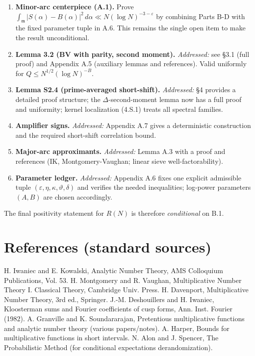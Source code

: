 \documentclass[11pt]{article}
\theoremstyle{definition}
\theoremstyle{remark}
\begin{document}
\begin{enumerate}[label=\textbf{B.\arabic*}]
	\item \textbf{Minor-arc centerpiece (A.1).} Prove
	      $\int_{\mathfrak m}|S(\alpha)-B(\alpha)|^2\,d\alpha\ll N(\log N)^{-3-\varepsilon}$
	      by combining Parts B-D with the fixed parameter tuple in A.6. This remains the single open item to make the result unconditional.

	\item \textbf{Lemma 3.2 (BV with parity, second moment).} \emph{Addressed:} see §3.1 (full proof) and Appendix A.5 (auxiliary lemmas and references). Valid uniformly for $Q\le N^{1/2}(\log N)^{-B}$.

	\item \textbf{Lemma S2.4 (prime-averaged short-shift).} \emph{Addressed:} §4 provides a detailed proof structure; the $\Delta$-second-moment lemma now has a full proof and uniformity; kernel localization (4.S.1) treats all spectral families.

	\item \textbf{Amplifier signs.} \emph{Addressed:} Appendix A.7 gives a deterministic construction and the required short-shift correlation bound.

	\item \textbf{Major-arc approximants.} \emph{Addressed:} Lemma A.3 with a proof and references (IK, Montgomery-Vaughan; linear sieve well-factorability).

	\item \textbf{Parameter ledger.} \emph{Addressed:} Appendix A.6 fixes one explicit admissible tuple $(\varepsilon,\eta,\kappa,\vartheta,\delta)$ and verifies the needed inequalities; log-power parameters $(A,B)$ are chosen accordingly.
\end{enumerate}

The final positivity statement for $R(N)$ is therefore \emph{conditional} on B.1.

\section*{References (standard sources)}
H. Iwaniec and E. Kowalski, Analytic Number Theory, AMS Colloquium Publications, Vol. 53.
H. Montgomery and R. Vaughan, Multiplicative Number Theory I. Classical Theory, Cambridge Univ. Press.
H. Davenport, Multiplicative Number Theory, 3rd ed., Springer.
J.-M. Deshouillers and H. Iwaniec, Kloosterman sums and Fourier coefficients of cusp forms, Ann. Inst. Fourier (1982).
A. Granville and K. Soundararajan, Pretentious multiplicative functions and analytic number theory (various papers/notes).
A. Harper, Bounds for multiplicative functions in short intervals.
N. Alon and J. Spencer, The Probabilistic Method (for conditional expectations derandomization).
\end{document}
